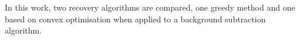 





In this work, two recovery algorithms are compared, one greedy method and one based on convex optimisation when applied to a background subtraction algorithm. 


